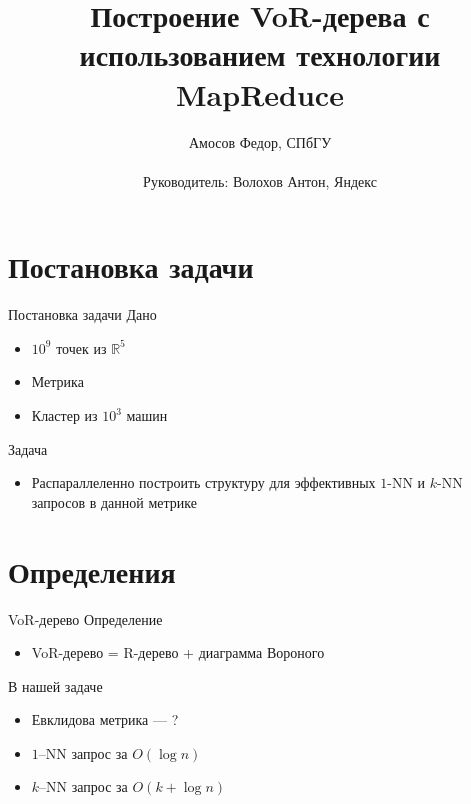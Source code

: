 \documentclass[14pt, fleqn, xcolor={dvipsnames, table}]{beamer}
\title{Построение VoR-дерева с использованием технологии MapReduce\\\small{}}
\author[]{
    \small{
        Амосов Федор, СПбГУ\\
        ~\\
        Руководитель: Волохов Антон, Яндекс
    }
}
\date{}
\begin{document}
    \begin{frame}
        \maketitle
        \small
    \end{frame}

    \section{Постановка задачи}  
    
        \begin{frame}{Постановка задачи}
            Дано
            \begin{itemize}
                \item $10^9$ точек из $\mathbb{R}^5$
                \item Метрика
                \item Кластер из $10^3$ машин
            \end{itemize}  
            Задача
            \begin{itemize}
                \item Распараллеленно построить структуру для эффективных $1$-NN и $k$-NN запросов в данной метрике
            \end{itemize}         
        \end{frame}
        
    \section{Определения}
        
        \begin{frame}{VoR-дерево}
            Определение
            \begin{itemize}
                \item VoR-дерево = R-дерево + диаграмма Вороного
            \end{itemize}  
            В нашей задаче
            \begin{itemize}       
                \item Евклидова метрика --- ?
                \item $1$--NN запрос за $O(\log n)$
                \item $k$--NN запрос за $O(k + \log n)$
            \end{itemize}                
        \end{frame}
        
\end{document}
